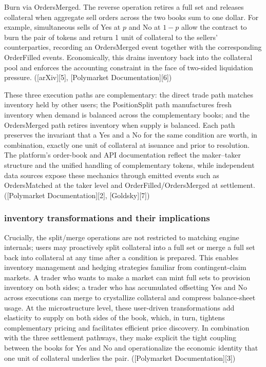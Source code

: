 Burn via OrdersMerged. The reverse operation retires a full set and releases collateral when aggregate sell orders across the two books sum to one dollar. For example, simultaneous sells of Yes at $p$ and No at $1-p$ allow the contract to burn the pair of tokens and return 1 unit of collateral to the sellers’ counterparties, recording an OrdersMerged event together with the corresponding OrderFilled events. Economically, this drains inventory back into the collateral pool and enforces the accounting constraint in the face of two-sided liquidation pressure. ([arXiv][5], [Polymarket Documentation][6])

These three execution paths are complementary: the direct trade path matches inventory held by other users; the PositionSplit path manufactures fresh inventory when demand is balanced across the complementary books; and the OrdersMerged path retires inventory when supply is balanced. Each path preserves the invariant that a Yes and a No for the same condition are worth, in combination, exactly one unit of collateral at issuance and prior to resolution. The platform’s order-book and API documentation reflect the maker–taker structure and the unified handling of complementary tokens, while independent data sources expose these mechanics through emitted events such as OrdersMatched at the taker level and OrderFilled/OrdersMerged at settlement. ([Polymarket Documentation][2], [Goldsky][7])

\subsubsection{inventory transformations and their implications}

Crucially, the split/merge operations are not restricted to matching engine internals; users may proactively split collateral into a full set or merge a full set back into collateral at any time after a condition is prepared. This enables inventory management and hedging strategies familiar from contingent-claim markets. A trader who wants to make a market can mint full sets to provision inventory on both sides; a trader who has accumulated offsetting Yes and No across executions can merge to crystallize collateral and compress balance-sheet usage. At the microstructure level, these user-driven transformations add elasticity to supply on both sides of the book, which, in turn, tightens complementary pricing and facilitates efficient price discovery. In combination with the three settlement pathways, they make explicit the tight coupling between the books for Yes and No and operationalize the economic identity that one unit of collateral underlies the pair. ([Polymarket Documentation][3])

